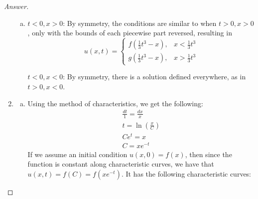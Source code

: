 \documentclass{article}
\theoremstyle{definition}
\renewcommand\qedsymbol{$\blacksquare$}
\newenvironment{ans}{\begin{proof}[Answer]\renewcommand{\qedsymbol}{}}{\end{proof}}
\begin{document}
\begin{ans}
\begin{enumerate}[(1), series=answers]
\begin{enumerate}[a)]
                    \item \underline{$t < 0, x > 0$}: By symmetry, the conditions are similar to when $t > 0, x > 0$, only with the bounds of each piecewise part reversed, resulting in  \begin{equation*}
                    u(x,t) =
                    \begin{cases}
                        f\left(\frac{1}{3}t^3 - x\right), & x < \frac{1}{3}t^3\\
                        g\left(\frac{1}{3}t^3 - x\right), & x > \frac{1}{3}t^3
                    \end{cases}
                    \end{equation*}
                    
                    \underline{$t < 0, x < 0$}: By symmetry, there is a solution defined everywhere, as in $t > 0, x < 0$.
                \end{enumerate}
			
			\item \begin{enumerate}[a)]
                    \item Using the method of characteristics, we get the following:
                    \begin{align*}
                        \frac{dt}{1} = \frac{dx}{x}\\
                        t=\ln(\frac{x}{C})\\
                        Ce^t = x\\
			C = xe^{-t}
                    \end{align*}
                    If we assume an initial condition $u(x,0) = f(x)$, then since the function is constant along characteristic curves, we have that $\boxed{u(x,t) = f(C) = f\left(xe^{-t}\right)}$. It has the following characteristic curves:
                    
                    \begin{center}
                    \end{center}


\end{enumerate}
\end{enumerate}
\end{ans}
\end{document}
